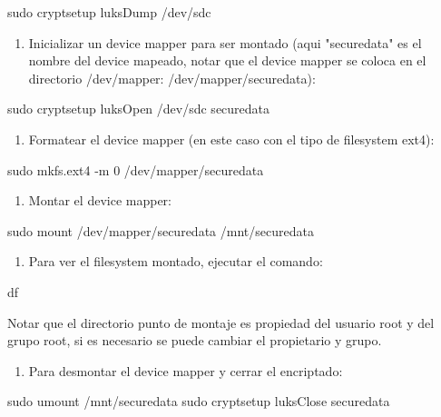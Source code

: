 \begin{SourceCode}
sudo cryptsetup luksDump /dev/sdc
\end{SourceCode}

\begin{enumerate}
\item Inicializar un device mapper para ser montado (aqui "securedata" es el nombre del device mapeado, notar que el device mapper se coloca en el directorio /dev/mapper:  /dev/mapper/securedata):
\end{enumerate}

\begin{SourceCode}
sudo cryptsetup luksOpen /dev/sdc securedata
\end{SourceCode}

\begin{enumerate}
\item Formatear el device mapper (en este caso con el tipo de filesystem ext4):
\end{enumerate}

\begin{SourceCode}
sudo mkfs.ext4 -m 0 /dev/mapper/securedata
\end{SourceCode}

\begin{enumerate}
\item Montar el device mapper:
\end{enumerate}

\begin{SourceCode}
sudo mount /dev/mapper/securedata /mnt/securedata
\end{SourceCode}

\begin{enumerate}
\item Para ver el filesystem montado, ejecutar el comando:
\end{enumerate}

\begin{SourceCode}
df
\end{SourceCode}

Notar que el directorio punto de montaje es propiedad del usuario root y del grupo root, si es necesario se puede cambiar el propietario y grupo.

\begin{enumerate}
\item Para desmontar el device mapper y cerrar el encriptado:
\end{enumerate}

\begin{SourceCode}
sudo umount /mnt/securedata
sudo cryptsetup luksClose securedata
\end{SourceCode}

